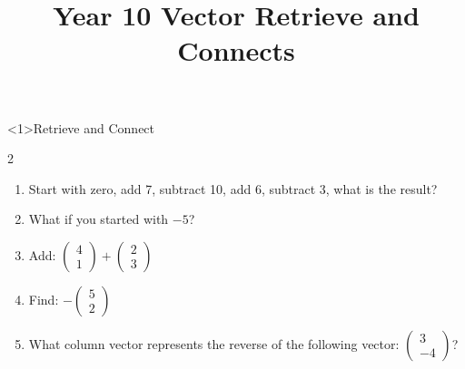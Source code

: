 \documentclass{beamer}
\title{Year 10 Vector Retrieve and Connects}
\date{}
\newcommand{\ashow}[1]{\uncover<2->{\textcolor{red}{\small #1}}}
\begin{document}

\begin{frame}<1>{Retrieve and Connect}

\begin{multicols}{2}
\begin{enumerate}
  \item Start with zero, add 7, subtract 10, add 6, subtract 3, what is the result? \ashow{0}
  \item What if you started with $-5$? \ashow{$-5$}
  \item Add:
  $\begin{pmatrix}4\\1\end{pmatrix}
  +
  \begin{pmatrix}2\\3\end{pmatrix}$ \ashow{\(\binom{6}{4}\)}
  \item Find:
  $-\begin{pmatrix}5\\2\end{pmatrix}$ \ashow{\(\binom{-5}{-2}\)}
  \item What column vector represents the reverse of the following vector:
  $\begin{pmatrix}3\\-4\end{pmatrix}$? \ashow{\(\binom{-3}{4}\)}
\end{enumerate}
\end{multicols}

\vspace{0.3cm}



\begin{columns}[T]

\begin{center}
\end{center}


\end{columns}
\end{frame}
\end{document}
